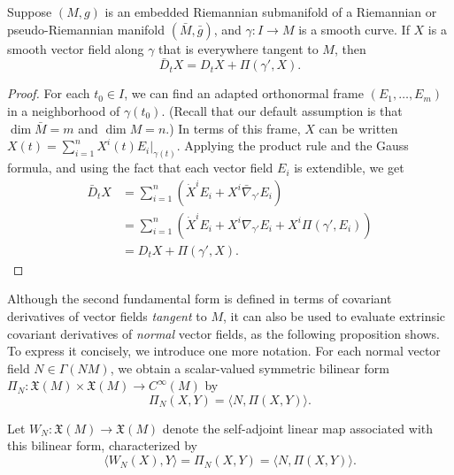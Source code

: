 \begin{corollary}
\label{cor:gauss-formula-along-curve}

Suppose $(M,g)$ is an embedded Riemannian submanifold of a Riemannian or pseudo-Riemannian manifold $(\bar{M}, \bar{g})$, and $\gamma : I \to M$ is a smooth curve. If $X$ is a smooth vector field along $\gamma$ that is everywhere tangent to $M$, then
\begin{equation}
\bar{D}_t X = D_t X + \Pi(\gamma', X).
\tag{8.2}
\end{equation}
\end{corollary}

\begin{proof}
For each $t_0 \in I$, we can find an adapted orthonormal frame $(E_1, \ldots, E_m)$ in a neighborhood of $\gamma(t_0)$. (Recall that our default assumption is that $\dim \bar{M} = m$ and $\dim M = n$.) In terms of this frame, $X$ can be written $X(t) = \sum_{i=1}^n X^i(t) E_i|_{\gamma(t)}$. Applying the product rule and the Gauss formula, and using the fact that each vector field $E_i$ is extendible, we get
\begin{align*}
\bar{D}_t X &= \sum_{i=1}^n \left( \dot{X}^i E_i + X^i \bar{\nabla}_{\gamma'} E_i \right) \\
&= \sum_{i=1}^n \left( \dot{X}^i E_i + X^i \nabla_{\gamma'} E_i + X^i \Pi(\gamma', E_i) \right) \\
&= D_t X + \Pi(\gamma', X).
\end{align*}
\end{proof}

Although the second fundamental form is defined in terms of covariant derivatives of vector fields \emph{tangent} to $M$, it can also be used to evaluate extrinsic covariant derivatives of \emph{normal} vector fields, as the following proposition shows. To express it concisely, we introduce one more notation. For each normal vector field $N \in \Gamma(NM)$, we obtain a scalar-valued symmetric bilinear form $\Pi_N : \mathfrak{X}(M) \times \mathfrak{X}(M) \to C^\infty(M)$ by
\begin{equation}
\Pi_N(X,Y) = \langle N, \Pi(X,Y) \rangle.
\tag{8.3}
\end{equation}

Let $W_N : \mathfrak{X}(M) \to \mathfrak{X}(M)$ denote the self-adjoint linear map associated with this bilinear form, characterized by
\begin{equation}
\langle W_N(X), Y \rangle = \Pi_N(X,Y) = \langle N, \Pi(X,Y) \rangle.
\tag{8.4}
\end{equation}

